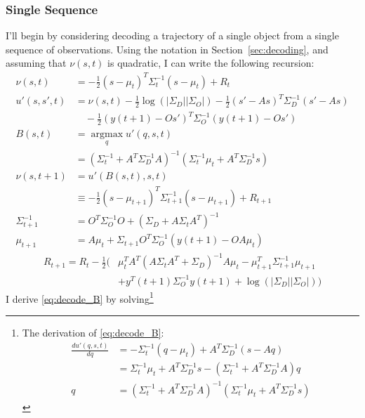 \documentclass[12pt]{article}
\newcommand{\ti}[2]{{#1}{(#2)}}                         %
\newcommand{\argmax}{\operatorname*{argmax}}
\newcommand{\logdet}{\log\left(\left|\Sigma_D\right| \left| \Sigma_O
    \right| \right)}
\begin{document}
\subsubsection{Single Sequence}
\label{sec:single-sequence}

I'll begin by considering decoding a trajectory of a single object
from a single sequence of observations.  Using the notation in
Section~\ref{sec:decoding}, and assuming that $\nu(s,t)$ is quadratic,
I can write the following recursion:
\begin{align}
  \nu(s,t) &= -\frac{1}{2}(s-\mu_{t})^T
    \Sigma_{t}^{-1}(s-\mu_{t}) + R_t \nonumber \\
  \label{eq:decode_u'}
  u'(s,s',t) &= \nu(s,t) -\frac{1}{2} \logdet  - 
  \frac{1}{2}(s'-As)^T \Sigma_{D}^{-1} (s'-As)  \nonumber \\
  &\quad - \frac{1}{2}(\ti{y}{t+1} - O s')^T \Sigma_{O}^{-1}(\ti{y}{t+1}
    - O s') \\
  B(s,t) &= \argmax_{q} u'(q,s,t) \nonumber \\
  \label{eq:decode_B}
  &= \left( \Sigma_t^{-1} + A^T \Sigma_D^{-1} A \right)^{-1} \left(
    \Sigma_t^{-1} \mu_t + A^T \Sigma_D^{-1} s \right) \\
  \nu(s,t+1) &= u'(B(s,t),s,t) \nonumber \\
  &\equiv  -\frac{1}{2}(s-\mu_{t+1})^T
  \Sigma_{t+1}^{-1}(s-\mu_{t+1}) + R_{t+1} \nonumber \\
  \label{eq:new_Sigma}
  \Sigma_{t+1}^{-1} & = O^T\Sigma_O^{-1} O + \left( \Sigma_D + A \Sigma_t
    A^T \right)^{-1} \\
  \label{eq:new_mu}
  \mu_{t+1} &= A \mu_t + \Sigma_{t+1} O^T \Sigma_O^{-1} (\ti{y}{t+1} -
  OA \mu_t)
\end{align}
\begin{subequations}
  \label{eq:new_R}
  \begin{align}
    R_{t+1} = R_t -\frac{1}{2} \Big( &
    \mu_t^T  A^T(A\Sigma_t A^T + \Sigma_D)^{-1}A \mu_t 
    - \mu_{t+1}^T \Sigma_{t+1}^{-1} \mu_{t+1} \\
    \label{eq:new_R.const}
    & + \ti{y^T}{t+1} \Sigma_O^{-1} \ti{y}{t+1} + \logdet \Big)
  \end{align}
\end{subequations}
I derive \eqref{eq:decode_B} by
solving\footnote{The derivation of \eqref{eq:decode_B}:
  \begin{align*}
    \frac{d u'(q,s,t)}{d q} &= -\Sigma_t^{-1}(q-\mu_t) + A^T \Sigma_D^{-1}
    (s - Aq) \\
    &= \Sigma_t^{-1}\mu_t + A^T \Sigma_D^{-1} s -(\Sigma_t^{-1} +
    A^T\Sigma_D^{-1}A)q \\
    q &= \left( \Sigma_t^{-1} + A^T\Sigma_D^{-1}A\right)^{-1} \left(
      \Sigma_t^{-1}\mu_t + A^T \Sigma_D^{-1} s \right)
  \end{align*}
}
\end{document}
